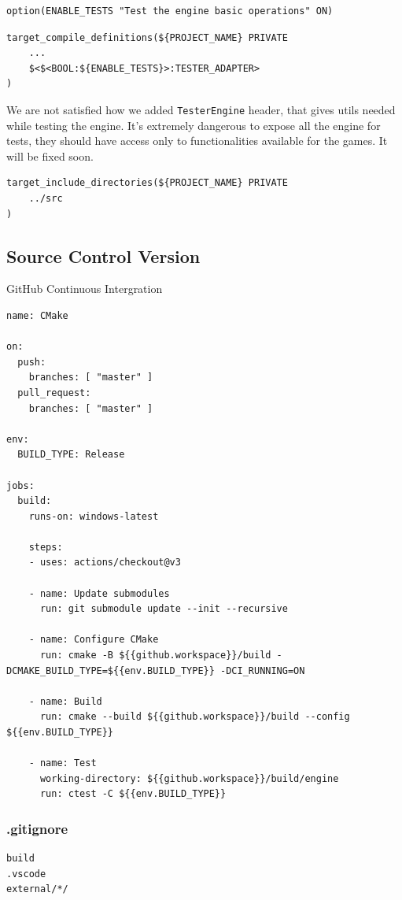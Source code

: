 \begin{lstlisting}[caption=Enabling Tests(./CMakeLists.txt)]
option(ENABLE_TESTS "Test the engine basic operations" ON)
\end{lstlisting}

\begin{lstlisting}[caption=\texttt{TESTER\_ADAPTER} preprocessor declaration(./engine/CMakeLists.txt and ./engine/tests/CMakeLists.txt)]
target_compile_definitions(${PROJECT_NAME} PRIVATE
    ...
    $<$<BOOL:${ENABLE_TESTS}>:TESTER_ADAPTER>
)
\end{lstlisting}

We are not satisfied how we added \texttt{TesterEngine} header, that gives utils needed while testing the engine. It's extremely dangerous to expose all the engine for tests, they should have access only to functionalities available for the games. It will be fixed soon. 
\begin{lstlisting}[caption=Including common internal utils (./engine/tests/CMakeLists.txt)]
target_include_directories(${PROJECT_NAME} PRIVATE
    ../src
)
\end{lstlisting}

\subsection{Source Control Version}
\label{sec:scv}
GitHub Continuous Intergration
\label{lst:cicmake}
\begin{lstlisting}[caption=Continuous intergration's build test (./.github/workflows/.cmake.yml)]
name: CMake

on:
  push:
    branches: [ "master" ]
  pull_request:
    branches: [ "master" ]

env:
  BUILD_TYPE: Release

jobs:
  build:
    runs-on: windows-latest

    steps:
    - uses: actions/checkout@v3

    - name: Update submodules
      run: git submodule update --init --recursive

    - name: Configure CMake
      run: cmake -B ${{github.workspace}}/build -DCMAKE_BUILD_TYPE=${{env.BUILD_TYPE}} -DCI_RUNNING=ON

    - name: Build
      run: cmake --build ${{github.workspace}}/build --config ${{env.BUILD_TYPE}}

    - name: Test
      working-directory: ${{github.workspace}}/build/engine
      run: ctest -C ${{env.BUILD_TYPE}}
\end{lstlisting}

\subsubsection{.gitignore}
\begin{lstlisting}[caption=\textttt{.gitignore} (./.gitignore)]
build
.vscode
external/*/
\end{lstlisting}
